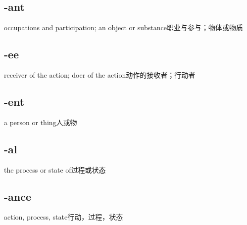 \subsection{-ant}

\begin{nlist}{occupations and participation; an object or substance}{职业与参与；物体或物质}
\end{nlist}

\subsection{-ee}

\begin{nlist}{receiver of the action; doer of the action}{动作的接收者；行动者}
\end{nlist}

\subsection{-ent}

\begin{nlist}{a person or thing}{人或物}
\end{nlist}

\subsection{-al}

\begin{nlist}{the process or state of}{过程或状态}
\end{nlist}

\subsection{-ance}

\begin{nlist}{action, process, state}{行动，过程，状态}
\end{nlist}

